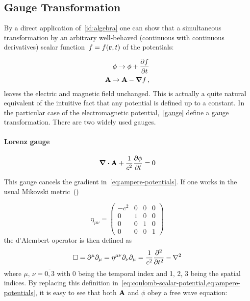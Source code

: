 \documentclass[12pt, class=report, crop=false]{standalone}
\begin{document}
\subsection{Gauge Transformation}
By a direct application of~\cref{id:algebra} one can show that a simultaneous transformation by an arbitrary well-behaved (continuous with continuous derivatives) scalar function~\(f=f(\vb{r},t)\) of the potentials:

\begin{subequations}
  \label{gauge}
  \begin{align}
    \phi \rightarrow \phi + \pdv{f}{t} \\
    \vb{A} \rightarrow \vb{A} - \grad{f} \,,
  \end{align}
\end{subequations}
leaves the electric and magnetic field unchanged. This is actually a quite natural equivalent of the intuitive fact that any potential is defined up to a constant. In the particular case of the electromagnetic potential,~\cref{gauge} define a gauge transformation. There are two widely used gauges.

\paragraph{Lorenz gauge}

\begin{equation}
  \label{eq:lorenz-gauge}
  \div{\vb{A}} + \frac{1}{c^2} \pdv{\phi}{t}=0
\end{equation}

\par
This gauge cancels the gradient in~\cref{eq:ampere-potentials}. If one works in the usual Mikovski metric~(\cite{weinbergGravitationCosmologyPrinciples1972})

\[
\eta_{\mu \nu} =
\begin{pmatrix}
  -c^{2} & 0 & 0 & 0 \\
  0 & 1 & 0 & 0 \\
  0 & 0 & 1 & 0 \\
  0 & 0 & 0 & 1
\end{pmatrix}
\]
the d'Alembert operator is then defined as
\[
\Box = \partial^{\mu} \partial_{\mu} = \eta^{\mu \nu} \partial_{\nu} \partial_{\mu} = \frac{1}{c^{2}} \pdv[2]{}{t} - \laplacian{}
\]
where \(\mu,\,\nu=\overline{0,3}\) with 0 being the temporal index and 1, 2, 3 being the spatial indices. By replacing this definition in~\cref{eq:coulomb-scalar-potential,eq:ampere-potentials}, it is easy to see that both \(\vb{A}\) and \(\phi\) obey a free wave equation:
\end{document}
